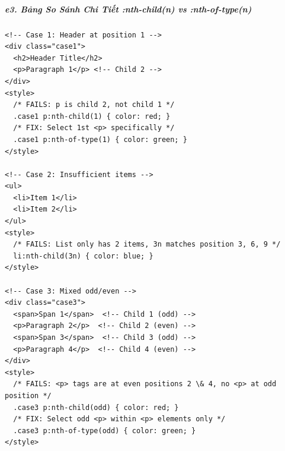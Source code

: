 \documentclass[11pt,oneside]{book}
\begin{document}

\subparagraph{e3. Bảng So Sánh Chi Tiết :nth-child(n) vs :nth-of-type(n)}
\mbox{}\par\vspace{2pt}

\begin{codeWindow}
\begin{lstlisting}[language=HTML5]
<!-- Case 1: Header at position 1 -->
<div class="case1">
  <h2>Header Title</h2>
  <p>Paragraph 1</p> <!-- Child 2 -->
</div>
<style>
  /* FAILS: p is child 2, not child 1 */
  .case1 p:nth-child(1) { color: red; }
  /* FIX: Select 1st <p> specifically */
  .case1 p:nth-of-type(1) { color: green; }
</style>

<!-- Case 2: Insufficient items -->
<ul>
  <li>Item 1</li>
  <li>Item 2</li>
</ul>
<style>
  /* FAILS: List only has 2 items, 3n matches position 3, 6, 9 */
  li:nth-child(3n) { color: blue; }
</style>

<!-- Case 3: Mixed odd/even -->
<div class="case3">
  <span>Span 1</span>  <!-- Child 1 (odd) -->
  <p>Paragraph 2</p>  <!-- Child 2 (even) -->
  <span>Span 3</span>  <!-- Child 3 (odd) -->
  <p>Paragraph 4</p>  <!-- Child 4 (even) -->
</div>
<style>
  /* FAILS: <p> tags are at even positions 2 \& 4, no <p> at odd position */
  .case3 p:nth-child(odd) { color: red; }
  /* FIX: Select odd <p> within <p> elements only */
  .case3 p:nth-of-type(odd) { color: green; }
</style>
\end{lstlisting}
\end{codeWindow}
\end{document}
